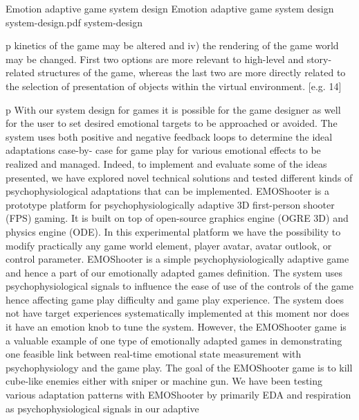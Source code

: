 \img
{Emotion adaptive game system design}
{Emotion adaptive game system design}
{system-design.pdf}
{system-design}


p kinetics of the game may be altered and iv) the rendering of the game world may be changed. First two options are more relevant to high-level and story-related structures of the game, whereas the last two are more directly related to the selection of presentation of objects within the virtual environment. [e.g. 14]

p With our system design for games it is possible for the game designer as well for the user to set desired emotional targets to be approached or avoided. The system uses both positive and negative feedback loops to determine the ideal adaptations case-by- case for game play for various emotional effects to be realized and managed. Indeed, to implement and evaluate some of the ideas presented, we have explored novel technical solutions and tested different kinds of psychophysiological adaptations that can be implemented. EMOShooter is a prototype platform for psychophysiologically adaptive 3D first-person shooter (FPS) gaming. It is built on top of open-source graphics engine (OGRE 3D) and physics engine (ODE). In this experimental platform we have the possibility to modify practically any game world element, player avatar, avatar outlook, or control parameter.  EMOShooter is a simple psychophysiologically adaptive game and hence a part of our emotionally adapted games definition. The system uses psychophysiological signals to influence the ease of use of the controls of the game hence affecting game play difficulty and game play experience. The system does not have target experiences systematically implemented at this moment nor does it have an emotion knob to tune the system. However, the EMOShooter game is a valuable example of one type of emotionally adapted games in demonstrating one feasible link between real-time emotional state measurement with psychophysiology and the game play. The goal of the EMOShooter game is to kill cube-like enemies either with sniper or machine gun. We have been testing various adaptation patterns with EMOShooter by primarily EDA and respiration as psychophysiological signals in our adaptive 

